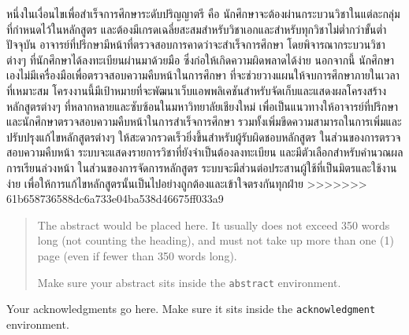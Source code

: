 \begin{abstractTH}
\vfill
{}
{\color{Green4}
หนึ่งในเงื่อนไขเพื่อสำเร็จการศึกษาระดับปริญญาตรี คือ นักศึกษาจะต้องผ่านกระบวนวิชาในแต่ละกลุ่มที่กำหนดไว้ในหลักสูตร และต้องมีเกรดเฉลี่ยสะสมสำหรับวิชาเอกและสำหรับทุกวิชาไม่ต่ำกว่าขั้นต่ำ
\enskip ปัจจุบัน อาจารย์ที่ปรึกษามีหน้าที่ตรวจสอบการคาดว่าจะสำเร็จการศึกษา โดยพิจารณากระบวนวิชาต่างๆ ที่นักศึกษาได้ลงทะเบียนผ่านมาด้วยมือ ซึ่งก่อให้เกิดความผิดพลาดได้ง่าย
\enskip นอกจากนี้ นักศึกษาเองไม่มีเครื่องมือเพื่อตรวจสอบความคืบหน้าในการศึกษา ที่จะช่วยวางแผนให้จบการศึกษาภายในเวลาที่เหมาะสม
\enskip โครงงานนี้มีเป้าหมายที่จะพัฒนาเว็บแอพพลิเคชันสำหรับจัดเก็บและแสดงผลโครงสร้างหลักสูตรต่างๆ ที่หลากหลายและซับซ้อนในมหาวิทยาลัยเชียงใหม่ เพื่อเป็นแนวทางให้อาจารย์ที่ปรึกษาและนักศึกษาตรวจสอบความคืบหน้าในการสำเร็จการศึกษา รวมทั้งเพิ่มขีดความสามารถในการเพิ่มและปรับปรุงแก้ไขหลักสูตรต่างๆ ให้สะดวกรวดเร็วยิ่งขึ้นสำหรับผู้รับผิดชอบหลักสูตร
\enskip ในส่วนของการตรวจสอบความคืบหน้า ระบบจะแสดงรายการวิชาที่ยังจำเป็นต้องลงทะเบียน และมีตัวเลือกสำหรับคำนวณผลการเรียนล่วงหน้า
\enskip ในส่วนของการจัดการหลักสูตร ระบบจะมีส่วนต่อประสานผู้ใช้ที่เป็นมิตรและใช้งานง่าย เพื่อให้การแก้ไขหลักสูตรนั้นเป็นไปอย่างถูกต้องและเข้าใจตรงกันทุกฝ่าย
}
>>>>>>> 61b658736588dc6a733e04ba538d46675ff033a9
\end{abstractTH}

\begin{abstract}
The abstract would be placed here. It usually does not exceed 350 words
long (not counting the heading), and must not take up more than one (1) page
(even if fewer than 350 words long).

Make sure your abstract sits inside the \texttt{abstract} environment.
\end{abstract}

\iffalse
\begin{dedication}
This document is dedicated to all Chiang Mai University students.

Dedication page is optional.
\end{dedication}
\fi %

\begin{acknowledgments}
Your acknowledgments go here. Make sure it sits inside the
\texttt{acknowledgment} environment.

\end{acknowledgments}%
\fi %

\contentspage

\ifproject
\figurelistpage

\tablelistpage
\fi %



